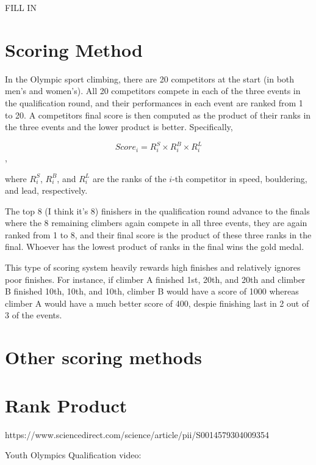 \documentclass{article}\usepackage[]{graphicx}\usepackage[]{color}
\begin{document}
FILL IN 

\section{Scoring Method}
In the Olympic sport climbing, there are 20 competitors at the start (in both men's and women's).  All 20 competitors compete in each of the three events in the qualification round, and their performances in each event are ranked from 1 to 20.  A competitors final score is then computed as the product of their ranks in the three events and the lower product is better.  Specifically, 

$$
Score_i = R^S_i\times R^B_i\times R^L_i
$$, 

where $R^S_i$, $R^B_i$, and $R^L_i$ are the ranks of the $i$-th competitor in speed, bouldering, and lead, respectively.  

The top 8 (I think it's 8) finishers in the qualification round advance to the finals where the 8 remaining climbers again compete in all three events, they are again ranked from 1 to 8, and their final score is the product of these three ranks in the final.  Whoever has the lowest product of ranks in the final wins the gold medal.  

This type of scoring system heavily rewards high finishes and relatively ignores poor finishes.  For instance, if climber A finished 1st, 20th, and 20th and climber B finished 10th, 10th, and 10th, climber B would have a score of 1000 whereas climber A would have a much better score of 400, despie finishing last in 2 out of 3 of the events.  

\section{Other scoring methods}


\section{Rank Product}
https://www.sciencedirect.com/science/article/pii/S0014579304009354


Youth Olympics Qualification video: %




\end{document}
